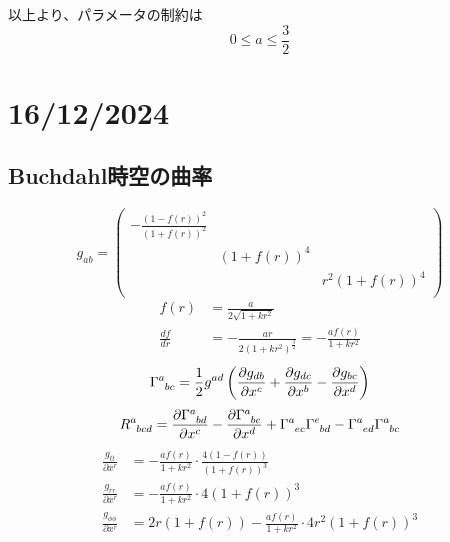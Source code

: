 \documentclass[dvipdfmx]{report} %
\begin{document}
以上より、パラメータの制約は
\[ 0 \leq a \leq \frac{3}{2} \]

\chapter{16/12/2024}
\section{Buchdahl時空の曲率}
\begin{equation*}
	g_{ab} = 
	\begin{pmatrix}
   	- \frac{(1 - f(r))^2}{(1 + f(r))^2} & & \\
   	& (1 + f(r))^4 &\\
	& & r^2(1 + f(r))^4\\
	\end{pmatrix}
\end{equation*}
\begin{equation*}
\begin{split}
	f(r) &= \frac{a}{2 \sqrt{1 + kr^2} }\\
	\frac{df}{dr} &= - \frac{ar}{2(1 + kr^2)^{\frac{3}{2}}} = - \frac{af(r)}{1 + kr^2}
\end{split}
\end{equation*}
\[
\tensor{\Gamma}{^a_{bc}} =
	\frac{1}{2}g^{ad}\left( \frac{\partial g_{db}}{\partial x^c}
	+ \frac{\partial g_{dc}}{\partial x^b}
	- \frac{\partial g_{bc}}{\partial x^d} \right)
\]
\[
\tensor{R}{^a_{bcd}} =
	\frac{\partial \tensor{\Gamma}{^a_{bd}}}{\partial x^c}
 	- \frac{\partial \tensor{\Gamma}{^a_{bc}}}{\partial x^d}
	+ \tensor{\Gamma}{^a_{ec}}\tensor{\Gamma}{^e_{bd}}
	- \tensor{\Gamma}{^a_{ed}}\tensor{\Gamma}{^a_{bc}}
\]
\begin{equation*}
\begin{split}
	\frac{g_{tt}}{\partial x^r} &= - \frac{a f(r)}{1 + kr^2} \cdot \frac{4(1 - f(r))}{(1 + f(r))^3}\\
	\frac{g_{rr}}{\partial x^r} &= - \frac{a f(r)}{1 + kr^2} \cdot 4(1 + f(r))^3\\
	\frac{g_{\phi \phi}}{\partial x^r} &= 2r(1 + f(r)) - \frac{a f(r)}{1 + kr^2} \cdot 4 r^2 (1 + f(r))^3\\
\end{split}
\end{equation*}
\end{document}
